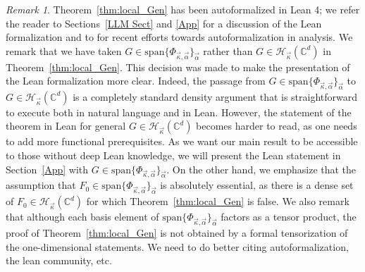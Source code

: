 \documentclass[11pt]{amsart}
\theoremstyle{remark}
\newtheorem{remark}[theorem]{Remark}
\begin{document}
\begin{remark}
    Theorem~\ref{thm:local_Gen} has been autoformalized in Lean 4; we refer the reader to Sections~\ref{LLM Sect} and \ref{App} for a discussion of the Lean formalization and to \cite{armstrong2026formalization,hariharan2026milestone} for recent efforts  towards autoformalization in analysis. We remark that we have taken $G\in \text{span}\{\Phi_{\vec \kappa,\vec\alpha}\}_{\vec \alpha}$ rather than $G\in \mathcal{H}_{\vec\kappa}(\mathbb{C}^d)$ in Theorem~\ref{thm:local_Gen}. This decision was made to make the presentation of the Lean formalization more clear. Indeed, the passage from $G\in \text{span}\{\Phi_{\vec \kappa,\vec\alpha}\}_{\vec \alpha}$ to $G\in \mathcal{H}_{\vec\kappa}(\mathbb{C}^d)$  is a completely standard density argument that is straightforward to execute both in natural language and in Lean. However, the statement of the theorem in Lean for general $G\in\mathcal{H}_{\vec\kappa}(\mathbb{C}^d)$ becomes harder to read, as one needs to add more functional prerequisites. As we want our main result to be accessible to those without deep Lean knowledge, we will present the Lean statement in Section~\ref{App} with $G\in \text{span}\{\Phi_{\vec \kappa,\vec\alpha}\}_{\vec \alpha}$. On the other hand, we emphasize that the assumption that $F_0\in\text{span}\{\Phi_{\vec \kappa,\vec\alpha}\}_{\vec \alpha}$ is absolutely essential, as there is a dense set of $F_0\in\mathcal{H}_{\vec\kappa}(\mathbb{C}^d)$ for which 
    Theorem~\ref{thm:local_Gen} is false. We also remark that although each basis
element of $\text{span}\{\Phi_{\vec \kappa,\vec\alpha}\}_{\vec \alpha}$ factors as a tensor product, the proof of Theorem~\ref{thm:local_Gen} is not obtained by a formal tensorization of the one-dimensional statements. {\color{red} We need to do better citing autoformalization, the lean community, etc.} 

\end{remark}
\end{document}
